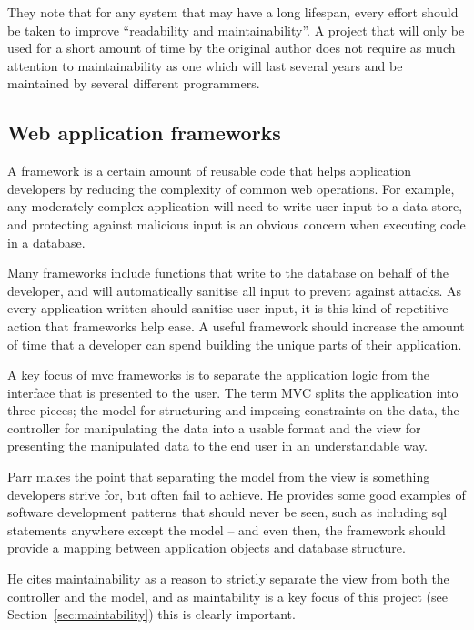 \documentclass[]{scrartcl}
\begin{document}
They note that for any system that may have a long lifespan, every effort
should be taken to improve ``readability and maintainability''. A project that
will only be used for a short amount of time by the original author does not
require as much attention to maintainability as one which will last several
years and be maintained by several different programmers.

\subsection{Web application frameworks}


A framework is a certain amount of reusable code that helps application
developers by reducing the complexity of common web operations. For example,
any moderately complex application will need to write user input to a data
store, and protecting against malicious input is an obvious concern when
executing code in a database.

Many frameworks include functions that write to the database on behalf of the
developer, and will automatically sanitise all input to prevent against
attacks. As every application written should sanitise user input, it is this
kind of repetitive action that frameworks help ease. A useful framework should
increase the amount of time that a developer can spend building the unique
parts of their application.

A key focus of \gls{mvc} frameworks is to separate the application logic from
the interface that is presented to the user. The term MVC splits the
application into three pieces; the model for structuring and imposing
constraints on the data, the controller for manipulating the data into a
usable format and the view for presenting the manipulated data to the end user
in an understandable way.

Parr \cite{Parr2004templateengines} makes the point that separating the model
from the view is something developers strive for, but often fail to achieve.
He provides some good examples of software development patterns that should
never be seen, such as including \gls{sql} statements anywhere except the
model -- and even then, the framework should provide a mapping between
application objects and database structure.

He cites maintainability as a reason to strictly separate the view from both
the controller and the model, and as maintability is a key focus of this
project (see Section~\ref{sec:maintability}) this is clearly important.
\end{document}
